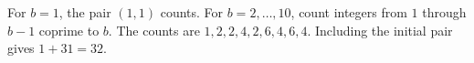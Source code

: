 For $b=1$, the pair $(1,1)$ counts. For $b=2,\ldots,10$, count integers from $1$ through $b-1$ coprime to $b$. The counts are $1,2,2,4,2,6,4,6,4$. Including the initial pair gives $1+31=\boxed{32}$.

